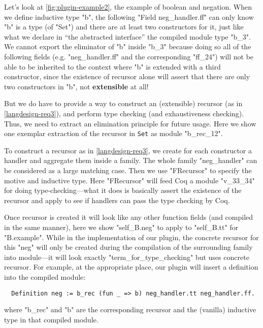 Let's look at \cref{fig:plugin-example2}, the example of boolean and
negation. When we define inductive type "b", the following "Field
neg_handler.ff" can only know "b" is a type (of "Set") and there are at
least two constructors for it, just like what we declare in ``the
abstracted interface'' the compiled module type "b_3". We cannot export
the eliminator of "b" inside "b_3" because doing so all of the following fields (e.g. "neg_handler.ff" and the corresponding "ff_24") will not be able to be inherited to the context where "b"
is extended with a third constructor, since the existence of recursor
alone will assert that there are only two constructors in "b", not
\textbf{extensible} at all!

But we do have to provide a way to construct an (extensible) recursor
(as in \ref{langdesign-req3}), and perform type checking (and
exhaustiveness checking). Thus, we need to extract an elimination
principle for future usage. Here we show one exemplar extraction of the
recursor in \texttt{Set} as module "b_rec_12".

To construct a recursor as in \ref{langdesign-req3}, we create for each
constructor a handler and aggregate them inside a family. The whole
family "neg_handler" can be considered as a large matching case. 
Then we use
"FRecursor" to specify the motive and inductive type. Here "FRecursor"
will feed Coq
a module "v_33_34" for doing type-checking---what it does is basically
assert the existence of the recursor and apply to see if handlers can
pass the type checking by Coq. 

Once recursor is created it will look like any other function fields (and compiled in the same manner), here we show "self_B.neg" to apply to "self_B.tt" for "B.example".  While in the implementation of our plugin, the concrete recursor for this "neg" will only be created during the compilation of the surrounding family into module---it will look exactly "term_for_type_checking" but uses concrete recursor. For example, at the appropriate place, our plugin will insert a definition into the compiled module: 
\begin{verbatim}
  Definition neg := b_rec (fun _ => b) neg_handler.tt neg_handler.ff.
\end{verbatim}
where "b_rec" and "b" are the corresponding recursor and the (vanilla) inductive type in that compiled module.


